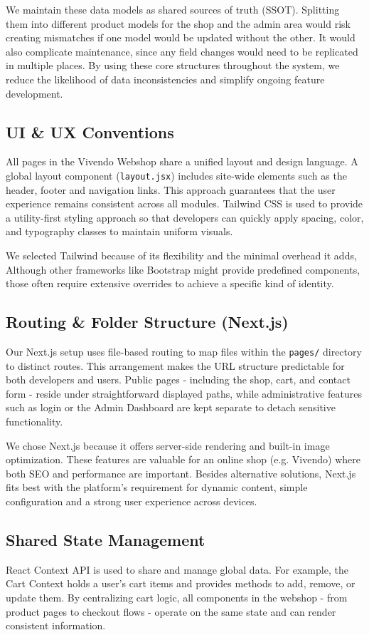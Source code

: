 We maintain these data models as shared sources of truth (SSOT). Splitting them into different product models for the shop and the admin area would risk creating mismatches if one model would be updated without the other. It would also complicate maintenance, since any field changes would need to be replicated in multiple places. By using these core structures throughout the system, we reduce the likelihood of data inconsistencies and simplify ongoing feature development.

\subsection{UI \& UX Conventions}
All pages in the Vivendo Webshop share a unified layout and design language. A global layout component (\texttt{layout.jsx}) includes site-wide elements such as the header, footer and navigation links. This approach guarantees that the user experience remains consistent across all modules. Tailwind CSS is used to provide a utility-first styling approach so that developers can quickly apply spacing, color, and typography classes to maintain uniform visuals. 

We selected Tailwind because of its flexibility and the minimal overhead it adds, Although other frameworks like Bootstrap might provide predefined components, those often require extensive overrides to achieve a specific kind of identity. 

\subsection{Routing \& Folder Structure (Next.js)}
Our Next.js setup uses file-based routing to map files within the \texttt{pages/} directory to distinct routes. This arrangement makes the URL structure predictable for both developers and users. Public pages - including the shop, cart, and contact form - reside under straightforward displayed paths, while administrative features such as login or the Admin Dashboard are kept separate to detach sensitive functionality.

We chose Next.js because it offers server-side rendering and built-in image optimization. These features are valuable for an online shop (e.g. Vivendo) where both SEO and performance are important. Besides alternative solutions, Next.js fits best with the platform's requirement for dynamic content, simple configuration and a strong user experience across devices.

\subsection{Shared State Management}
React Context API is used to share and manage global data. For example, the Cart Context holds a user’s cart items and provides methods to add, remove, or update them. By centralizing cart logic, all components in the webshop - from product pages to checkout flows - operate on the same state and can render consistent information. 

